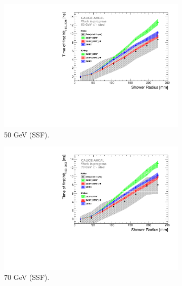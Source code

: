 \begin{figure}[htbp!]
\begin{subfigure}[t]{0.5\textwidth}
		\includegraphics[width=1\textwidth]{../Thesis_Plots/Timing/Pions/Plots/ComparisonToSim/Time_Radius_50GeV_SSF.pdf}
		\caption{50 GeV (SSF).} \label{fig:Radius_SSF_SimData_50GeV}
	\end{subfigure}
	\hfill
	\begin{subfigure}[t]{0.5\textwidth}
		\centering
		\includegraphics[width=1\textwidth]{../Thesis_Plots/Timing/Pions/Plots/ComparisonToSim/Time_Radius_70GeV_SSF.pdf}
		\caption{70 GeV (SSF).} \label{fig:Radius_SSF_SimData_70GeV}
	\end{subfigure}
	\hfill
	\begin{subfigure}[t]{0.5\textwidth}
		\centering

\end{subfigure}
\end{figure}
